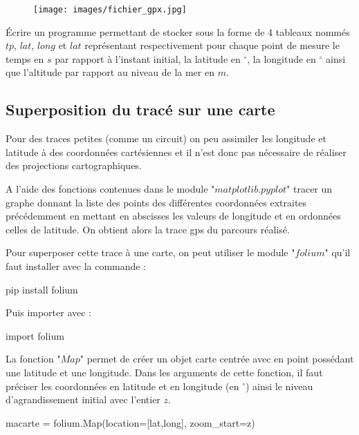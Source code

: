 \begin{figure}[!htb]
\begin{center}
\texttt{[image: images/fichier\_gpx.jpg]}
\end{center}
\end{figure}

\question{} Écrire un programme permettant de stocker sous la forme de 4 tableaux nommés $tp$, $lat$, $long$ et $lat$ représentant respectivement pour chaque point de mesure le temps en $s$ par rapport à l'instant initial, la latitude en $^{\circ}$, la longitude en $^{\circ}$ ainsi que l'altitude par rapport au niveau de la mer en $m$.

\subsection{Superposition du tracé sur une carte}

Pour des traces petites (comme un circuit) on peu assimiler les longitude et latitude à des coordonnées cartésiennes et il n'est donc pas nécessaire de réaliser des projections cartographiques.

\question{} A l'aide des fonctions contenues dans le module "$matplotlib.pyplot$" tracer un graphe donnant la liste des points des différentes coordonnées extraites précédemment en mettant en abscisses les valeurs de longitude et en ordonnées celles de latitude. On obtient alors la trace gps du parcours réalisé.



Pour superposer cette trace à une carte, on peut utiliser le module "$folium$" qu'il faut installer avec la commande : 

\begin{pyverbatim}
pip install folium
\end{pyverbatim}

Puis importer avec :

\begin{pyverbatim}
import folium
\end{pyverbatim}

La fonction "$Map$" permet de créer un objet carte centrée avec en point possédant une latitude et une longitude. Dans les arguments de cette fonction, il faut préciser les coordonnées en latitude et en longitude (en $^{\circ}$) ainsi le niveau d'agrandissement initial avec l'entier $z$.

\begin{pyverbatim}
macarte = folium.Map(location=[lat,long], zoom_start=z)
\end{pyverbatim}

